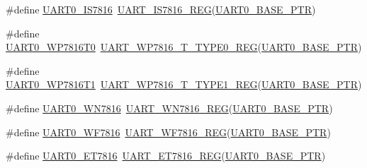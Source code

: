 \begin{DoxyCompactItemize}
\item 
\#define \hyperlink{group___u_a_r_t___register___accessor___macros_ga172a0f152249a9343a0b926e2db50c14}{U\+A\+R\+T0\+\_\+\+I\+S7816}~\hyperlink{group___u_a_r_t___register___accessor___macros_ga70744022bbc57cc63807b79daa7b3341}{U\+A\+R\+T\+\_\+\+I\+S7816\+\_\+\+R\+EG}(\hyperlink{group___u_a_r_t___peripheral_ga50a02c91ffbd11fa7b4f0c33fe585199}{U\+A\+R\+T0\+\_\+\+B\+A\+S\+E\+\_\+\+P\+TR})
\item 
\#define \hyperlink{group___u_a_r_t___register___accessor___macros_gae40d003e55ce610c8e3d54a01d1f034a}{U\+A\+R\+T0\+\_\+\+W\+P7816\+T0}~\hyperlink{group___u_a_r_t___register___accessor___macros_gae15cd9484cdbcf68a1ca6a3970c22aed}{U\+A\+R\+T\+\_\+\+W\+P7816\+\_\+\+T\+\_\+\+T\+Y\+P\+E0\+\_\+\+R\+EG}(\hyperlink{group___u_a_r_t___peripheral_ga50a02c91ffbd11fa7b4f0c33fe585199}{U\+A\+R\+T0\+\_\+\+B\+A\+S\+E\+\_\+\+P\+TR})
\item 
\#define \hyperlink{group___u_a_r_t___register___accessor___macros_ga972796136dccc81184d7b7840db5dfc3}{U\+A\+R\+T0\+\_\+\+W\+P7816\+T1}~\hyperlink{group___u_a_r_t___register___accessor___macros_gaf125f8e0b4618c70042e9007e77775de}{U\+A\+R\+T\+\_\+\+W\+P7816\+\_\+\+T\+\_\+\+T\+Y\+P\+E1\+\_\+\+R\+EG}(\hyperlink{group___u_a_r_t___peripheral_ga50a02c91ffbd11fa7b4f0c33fe585199}{U\+A\+R\+T0\+\_\+\+B\+A\+S\+E\+\_\+\+P\+TR})
\item 
\#define \hyperlink{group___u_a_r_t___register___accessor___macros_ga076b41489eb41b58c9223b47025ab571}{U\+A\+R\+T0\+\_\+\+W\+N7816}~\hyperlink{group___u_a_r_t___register___accessor___macros_gaf7886bbd2d26e698f9c3e2037c2f9668}{U\+A\+R\+T\+\_\+\+W\+N7816\+\_\+\+R\+EG}(\hyperlink{group___u_a_r_t___peripheral_ga50a02c91ffbd11fa7b4f0c33fe585199}{U\+A\+R\+T0\+\_\+\+B\+A\+S\+E\+\_\+\+P\+TR})
\item 
\#define \hyperlink{group___u_a_r_t___register___accessor___macros_ga1f1678af59afd4e7ada94a6f9a4c1219}{U\+A\+R\+T0\+\_\+\+W\+F7816}~\hyperlink{group___u_a_r_t___register___accessor___macros_gaf1e0b56a76d8a2c4ca3779df8ffbf777}{U\+A\+R\+T\+\_\+\+W\+F7816\+\_\+\+R\+EG}(\hyperlink{group___u_a_r_t___peripheral_ga50a02c91ffbd11fa7b4f0c33fe585199}{U\+A\+R\+T0\+\_\+\+B\+A\+S\+E\+\_\+\+P\+TR})
\item 
\#define \hyperlink{group___u_a_r_t___register___accessor___macros_ga102073e04fc50eb8630e872fde79057b}{U\+A\+R\+T0\+\_\+\+E\+T7816}~\hyperlink{group___u_a_r_t___register___accessor___macros_ga199178e229d7b224bf16cc80a56ed6e9}{U\+A\+R\+T\+\_\+\+E\+T7816\+\_\+\+R\+EG}(\hyperlink{group___u_a_r_t___peripheral_ga50a02c91ffbd11fa7b4f0c33fe585199}{U\+A\+R\+T0\+\_\+\+B\+A\+S\+E\+\_\+\+P\+TR})

\end{DoxyCompactItemize}
